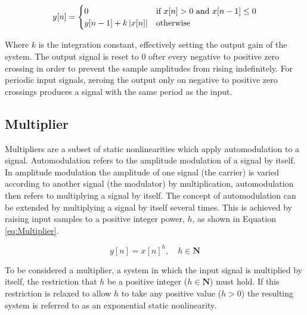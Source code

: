 		\begin{equation}
			y[n] = \begin{cases}
				0 & \text{if $x[n] > 0$ and $x[n - 1] \leq 0$} \\
				y[n - 1] + k\left|x[n]\right| & \text{otherwise}
			\end{cases}
			\label{eq:Integrator}
		\end{equation}

		Where $k$ is the integration constant, effectively setting the output gain of the system. The output signal
		is reset to 0 ofter every negative to positive zero crossing in order to prevent the sample amplitudes from
		rising indefinitely. For periodic input signals, zeroing the output only on negative to positive zero
		crossings produces a signal with the same period as the input.

	\subsection{Multiplier}
	\label{sec:Excitation-Methods-Multiplier}
		Multipliers are a subset of static nonlinearities which apply automodulation to a signal. Automodulation
		refers to the amplitude modulation of a signal by itself. In amplitude modulation the amplitude of one
		signal (the carrier) is varied according to another signal (the modulator) by multiplication, automodulation
		then refers to multiplying a signal by itself. The concept of automodulation can be extended by multiplying
		a signal by itself several times. This is achieved by raising input samples to a positive integer power,
		$h$, as shown in Equation \ref{eq:Multiplier}.

		\begin{equation}
			y[n] = x[n]^{h}, \quad h \in \textbf{N}
			\label{eq:Multiplier}
		\end{equation}

		To be considered a multiplier, a system in which the input signal is multiplied by itself, the restriction
		that $h$ be a positive integer ($h \in \textbf{N}$) must hold. If this restriction is relaxed to allow $h$
		to take any positive value ($h > 0$) the resulting system is referred to as an exponential static
		nonlinearity.

